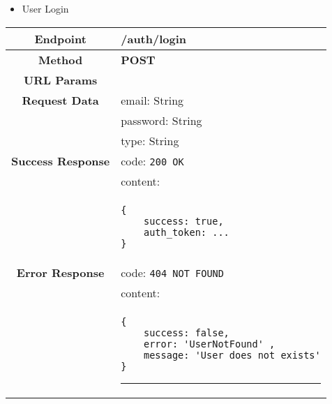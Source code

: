     \begin{itemize}
        \item User Login
    \end{itemize}
    \begin{adjustwidth}{1cm}{}
        \begin{longtable}{|c|l|}
            \hline
            \textbf{Endpoint} & /auth/login \\
            \hline
            \textbf{Method} & \textbf{POST} \\
            \hline
            \textbf{URL Params} &  \\
            \hline
            \textbf{Request Data} & email: String \\
            &                 password: String \\
            &                 type: String \\
            \hline
            \textbf{Success Response} & code: \texttt{200 OK} \\
            &                           content: \\
            & \begin{minipage}[t]{0.5\textwidth}
                \begin{adjustwidth}{1.5cm}{}
                \begin{verbatim}
{
    success: true, 
    auth_token: ...
}
                \end{verbatim}
                \end{adjustwidth}
              \end{minipage} \\
              \hline
            \textbf{Error Response} & code: \texttt{404 NOT FOUND} \\
            &                         content: \\
            & \begin{minipage}[t]{0.7\textwidth}
                \begin{adjustwidth}{1.5cm}{}
                \begin{verbatim}
{
    success: false, 
    error: 'UserNotFound' ,
    message: 'User does not exists'
}
                \end{verbatim}
                \end{adjustwidth}
                \par\noindent\rule{\textwidth}{1pt}
                \vspace{4pt}
              \end{minipage} \\

\end{longtable}
\end{adjustwidth}
